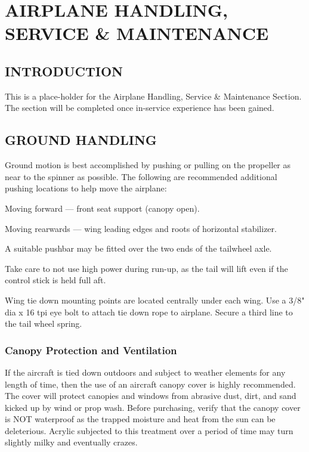 \chapter{AIRPLANE HANDLING, SERVICE \& MAINTENANCE} \vspace{\minitocspacebefore} \minitoc \cleardoublepage

\section{INTRODUCTION} This is a place-holder for the Airplane Handling, Service \& Maintenance Section. The section will be completed once in-service experience has been gained.

\section{GROUND HANDLING}
Ground motion is best accomplished by pushing or pulling on the propeller as near to the
spinner as possible. The following are recommended additional pushing locations to help move the
airplane: 

\begin{itemize*}
  \item Moving forward --- front seat support (canopy open).
  \item Moving rearwards --- wing leading edges and roots of horizontal stabilizer.
  \end{itemize*}

A suitable pushbar may be fitted over the two ends of the tailwheel axle.

Take care to not use high power during run-up, as the tail will lift even if the control stick is held full aft.

Wing tie down mounting points are located centrally under each wing. Use a 3/8" dia x 16
tpi eye bolt to attach tie down rope to airplane. Secure a third line to the tail wheel spring.

\subsection{Canopy Protection and Ventilation}
If the aircraft is tied down outdoors and subject to weather elements for any length of time, then the use of an aircraft canopy cover is highly recommended. The cover will protect canopies and windows from abrasive dust, dirt, and sand kicked up by wind or prop wash. Before purchasing, verify that the canopy cover is NOT waterproof as the trapped moisture and heat from the sun can be deleterious. Acrylic subjected to this treatment over a period of time may turn slightly milky and eventually crazes.

